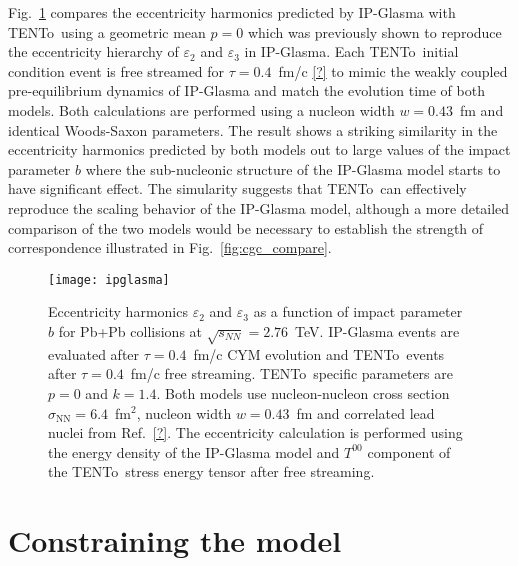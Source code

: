 \documentclass[aps,prc,reprint,amsmath,nofootinbib]{revtex4-1}
\newcommand{\trento}{T\raisebox{-0.5ex}{R}ENTo}
\newcommand{\sqrts}{\sqrt{s_{NN}}}
\begin{document}
Fig.~\ref{fig:ipglasma} compares the eccentricity harmonics predicted by IP-Glasma with \trento\ using a geometric mean ${p=0}$ which was previously shown to reproduce the eccentricity hierarchy of $\varepsilon_2$ and $\varepsilon_3$ in IP-Glasma. Each \trento\ initial condition event is free streamed for $\tau=0.4$~fm/c \ref{?} to mimic the weakly coupled pre-equilibrium dynamics of IP-Glasma and match the evolution time of both models. Both calculations are performed using a nucleon width $w=0.43$~fm and identical Woods-Saxon parameters. The result shows a striking similarity in the eccentricity harmonics predicted by both models out to large values of the impact parameter $b$ where the sub-nucleonic structure of the IP-Glasma model starts to have significant effect. The simularity suggests that \trento\ can effectively reproduce the scaling behavior of the IP-Glasma model, although a more detailed comparison of the two models would be necessary to establish the strength of correspondence illustrated in Fig.~\ref{fig:cgc_compare}. 
\begin{figure}[t]
    \centering
    \texttt{[image: ipglasma]}
    \caption{Eccentricity harmonics $\varepsilon_2$ and $\varepsilon_3$ as a function of impact parameter $b$ for Pb+Pb collisions at ${\sqrts=2.76}$~TeV. IP-Glasma events are evaluated after $\tau=0.4$~fm/c CYM evolution and \protect\trento\ events after $\tau=0.4$~fm/c free streaming. \protect\trento\ specific parameters are $p=0$ and $k=1.4$. Both models use nucleon-nucleon cross section $\sigma_\text{NN}=6.4$~fm$^2$, nucleon width $w=0.43$~fm and correlated lead nuclei from Ref.~\ref{?}. The eccentricity calculation is performed using the energy density of the IP-Glasma model and $T^{00}$ component of the \protect\trento\ stress energy tensor after free streaming.}
    \label{fig:ipglasma}
\end{figure}

\section{Constraining the model}
\end{document}
